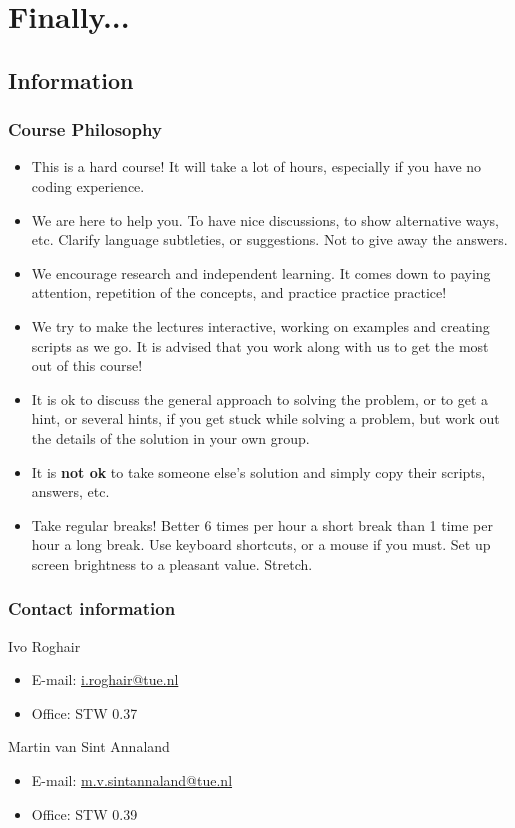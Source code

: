 \section{Finally...}
\subsection{Information}
{\nologo
\begin{frame}
  \frametitle{Course Philosophy}
 \begin{itemize}
  \item This is a hard course! It will take a lot of hours, especially if you have no coding experience.
  \item We are here to help you. To have nice discussions, to show alternative ways, etc. Clarify language subtleties, or suggestions. Not to give away the answers.
  \item We encourage research and independent learning. It comes down to paying attention, repetition of the concepts, and practice practice practice! 
  \item We try to make the lectures interactive, working on examples and creating scripts as we go. It is advised that you work along with us to get the most out of this course!
  \item It is ok to discuss the general approach to solving the problem, or to get a hint, or several hints, if you get stuck while solving a problem, but work out the details of the solution in your own group.
  \item It is {\textbf{not ok}} to take someone else’s solution and simply copy their scripts, answers, etc.
  \item Take regular breaks! Better 6 times per hour a short break than 1 time per hour a long break. Use keyboard shortcuts, or a mouse if you must. Set up screen brightness to a pleasant value. Stretch.
\end{itemize}
\end{frame}
}

\begin{frame}
 \frametitle{Contact information}
 \begin{block}{Ivo Roghair}
  \begin{itemize}
   \item E-mail: \href{mailto:i.roghair@tue.nl}{i.roghair@tue.nl}
   \item Office: STW 0.37
   \end{itemize} 
 \end{block}
 \vspace{1em}
  \begin{block}{Martin van Sint Annaland}
  \begin{itemize}
   \item E-mail: \href{mailto:m.v.sintannaland@tue.nl}{m.v.sintannaland@tue.nl}
   \item Office: STW 0.39 
   \end{itemize} 
 \end{block}
\end{frame}


